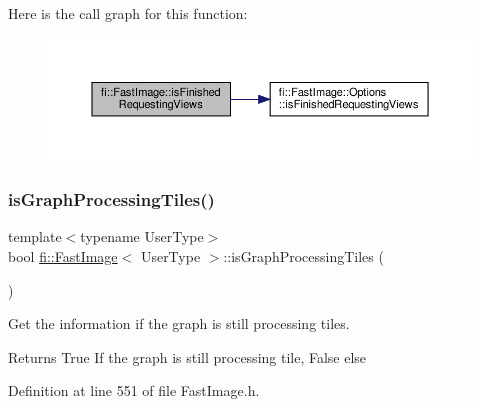 Here is the call graph for this function\+:
\nopagebreak
\begin{figure}[H]
\begin{center}
\leavevmode
\includegraphics[width=350pt]{dc/d6b/classfi_1_1FastImage_a9a9ebae36096801272a6a8bf8260ef05_cgraph}
\end{center}
\end{figure}
\mbox{\label{classfi_1_1FastImage_a21e4cc2542c571fad7ccdc9575aadb2c}} 
\subsubsection{\texorpdfstring{is\+Graph\+Processing\+Tiles()}{isGraphProcessingTiles()}}
{\footnotesize\ttfamily template$<$typename User\+Type$>$ \\
bool \hyperlink{classfi_1_1FastImage}{fi\+::\+Fast\+Image}$<$ User\+Type $>$\+::is\+Graph\+Processing\+Tiles (\begin{DoxyParamCaption}{ }\end{DoxyParamCaption})\hspace{0.3cm}{\ttfamily [inline]}}



Get the information if the graph is still processing tiles. 

\begin{DoxyReturn}{Returns}
True If the graph is still processing tile, False else 
\end{DoxyReturn}


Definition at line 551 of file Fast\+Image.\+h.

\mbox{\label{classfi_1_1FastImage_a81c5c39784220efcebce2121a6552e53}} 
